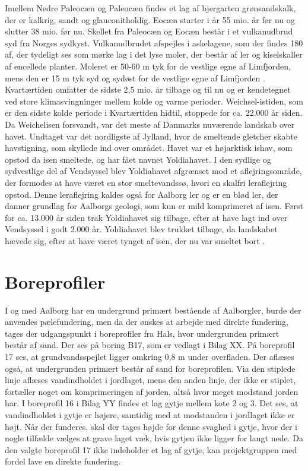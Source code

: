\newline \indent{     }  Imellem Nedre Paleocæn og Paleocæn findes et lag af bjergarten grønsandskalk, der er kalkrig, sandt og glauconitholdig.
\newline \indent{     }  Eocæn starter i år 55 mio. år før nu og slutter 38 mio. før nu. Skellet fra Paleocæn og Eocæn består i et vulkanudbrud syd fra Norges sydkyst. Vulkanudbrudet afspejles i askelagene, som der findes 180 af, der tydeligt ses som mørke lag i det lyse moler, der består af ler og kiselskaller af encellede planter. Moleret er 50-60 m tyk for de vestlige egne af Limfjorden, mens den er 15 m tyk syd og sydøst for de vestlige egne af Limfjorden \citep{geopdf}.
\newline
\newline
Kvartærtiden omfatter de sidste 2,5 mio. år tilbage og til nu og er kendetegnet ved store klimasvingninger mellem kolde og varme perioder. Weichsel-istiden, som er den sidste kolde periode i Kvartærtiden hidtil, stoppede for ca. 22.000 år siden. Da Weichelisen forsvandt, var det meste af Danmarks nuværende landskab over havet. Undtaget var det nordligste af Jylland, hvor de smeltende gletcher skabte havstigning, som skyllede ind over området. Havet var et højarktisk ishav, som opstod da isen smeltede, og har fået navnet Yoldiahavet. I den sydlige og sydvestlige del af Vendsyssel blev Yoldiahavet afgrænset mod et aflejringsområde, der formodes at have været en stor smeltevandssø, hvori en skalfri leraflejring opstod. Denne leraflejring kaldes også for Aalborg ler og er en blød ler, der danner grundlag for Aalborgs geologi, som kun er mild komprimeret af isen. Først for ca. 13.000 år siden trak Yoldiahavet sig tilbage, efter at have lagt ind over Vendsyssel i godt 2.000 år. Yoldiahavet blev trukket tilbage, da landskabet hævede sig, efter at have været tynget af isen, der nu var smeltet bort \citep{geopdf}.

\section{Boreprofiler} 
I og med Aalborg har en undergrund primært bestående af Aalborgler, burde der anvendes pælefundering, men da der ønskes at arbejde med direkte fundering, tages der udgangspunkt i boreprofiler fra Hals, hvor undergrunden primært består af sand. Der ses på boring B17, som er vedlagt i Bilag XX. 
\newline \indent{     }  På boreprofil 17 ses, at grundvandsspejlet ligger omkring 0,8 m under overfladen. Der aflæses også, at undergrunden primært består af sand for boreprofilen. Via den stiplede linje aflæses vandindholdet i jordlaget, mens den anden linje, der ikke er stiplet, fortæller noget om komprimeringen af jorden, altså hvor meget modstand jorden har.
\newline \indent{     }  I boreprofil 16 i Bilag YY findes et lag gytje mellem kote 2 og 3. Det ses, at vandindholdet i gytje er højere, samtidig med at modstanden i jordlaget ikke er højt. Når der funderes, skal der tages højde for denne svaghed i gytje, hvor der i nogle tilfælde vælges at grave laget væk, hvis gytjen ikke ligger for langt nede. Da den valgte boreprofil 17 ikke indeholder et lag af gytje, kan projektgruppen med fordel lave en direkte fundering. 